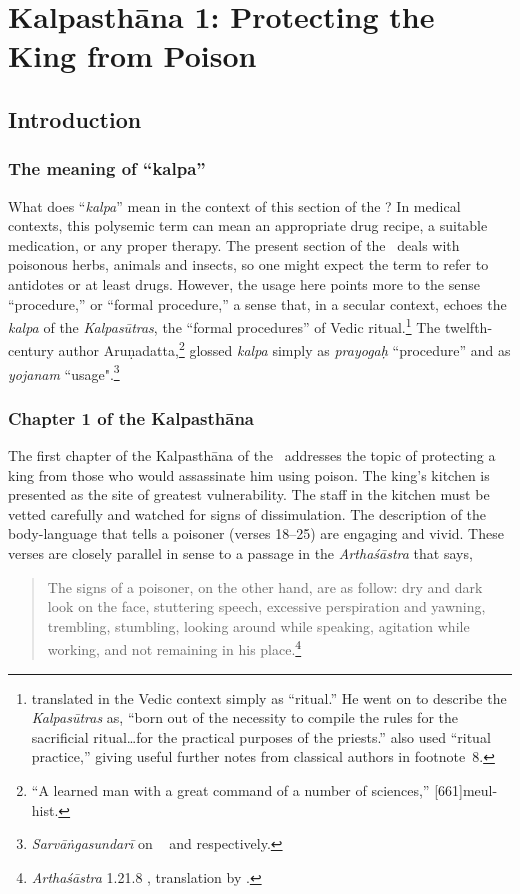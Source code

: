 \chapter{Kalpasthāna 1: Protecting the King from Poison}

\section{Introduction}

\subsection{The meaning of “kalpa”}

What does “\emph{kalpa}” mean in the context of this section of the
\SS? In medical contexts, this polysemic term can mean an appropriate
drug recipe, a suitable medication, or any proper therapy.  The
present section of the \SS\ deals with poisonous herbs, animals and
insects, so one might expect the term to refer to antidotes or at
least drugs. However, the usage here points more to the sense
“procedure,” or “formal procedure,”  a sense that, in a secular context, 
echoes the
\emph{kalpa} of the \emph{Kalpasūtras}, the “formal procedures” of
Vedic ritual.\footnote{\citet[252]{wint-1981} translated 
    in the Vedic context simply as “ritual.”  He went on to describe the
    \emph{Kalpasūtras} as, “born out of the necessity to compile the
rules for
    the sacrificial ritual\ldots for the practical purposes of the
    priests.” \citet[467]{gond-1977} also used “ritual practice,” giving
    useful  further notes from classical authors in footnote~8.}
The twelfth-century author Aruṇadatta,\footnote{“A learned man with a great
command of a number of sciences,” [661]{meul-hist}.}
glossed \emph{kalpa} simply as \emph{prayogaḥ} “procedure”  and as
\emph{yojanam} ``usage".\footnote{\emph{Sarvāṅgasundarī} on \AH\
     and  
    respectively.}


\subsection{Chapter 1 of the Kalpasthāna}
The first chapter of the Kalpasthāna of the \SS\
addresses the topic of protecting a king from those who would
assassinate him using poison. The king's kitchen is presented as the
site of greatest vulnerability.  The staff in the kitchen must be
vetted carefully and watched for signs of dissimulation.  The
description of the body-language that tells a poisoner (verses 18--25)
are engaging and vivid.  These verses are closely parallel in sense to
a passage in the \emph{Arthaśāstra} that says,
\begin{quote}
    The signs of a poisoner, on the other hand, are as follow: dry and
dark look on the face, stuttering speech, excessive perspiration
and yawning, trembling, stumbling, looking around while speaking,
agitation while working, and not remaining in his
place.\footnote{\emph{Arthaśāstra} 1.21.8 \citep[1,
    30]{kang-1969}, translation by \citet[97]{oliv-2013}.}
\end{quote}

